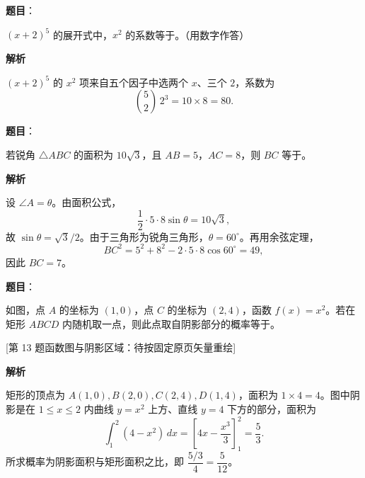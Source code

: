 \begin{answer}

\textbf{题目}：

$(x+2)^5$ 的展开式中，$x^2$ 的系数等于\gkblank{}。（用数字作答）

\textbf{解析}

$(x+2)^5$ 的 $x^2$ 项来自五个因子中选两个 $x$、三个 $2$，系数为
\nopagebreak[4]
\[
\binom52\,2^3=10\times8=80.
\]


\end{answer}
\begin{answer}

\textbf{题目}：

若锐角 $\triangle ABC$ 的面积为 $10\sqrt3$，且 $AB=5$，$AC=8$，则 $BC$ 等于\gkblank{}。

\textbf{解析}

设 $\angle A=\theta$。由面积公式，
\nopagebreak[4]
\[
\frac12\cdot5\cdot8\sin\theta=10\sqrt3,
\]
故 $\sin\theta=\sqrt3/2$。由于三角形为锐角三角形，$\theta=60^\circ$。再用余弦定理，
\nopagebreak[4]
\[
BC^2=5^2+8^2-2\cdot5\cdot8\cos60^\circ=49,
\]
因此 $BC=7$。


\end{answer}
\begin{answer}

\textbf{题目}：

如图，点 $A$ 的坐标为 $(1,0)$，点 $C$ 的坐标为 $(2,4)$，函数 $f(x)=x^2$。若在矩形 $ABCD$ 内随机取一点，则此点取自阴影部分的概率等于\gkblank{}。

[第 13 题函数图与阴影区域：待按固定原页矢量重绘]

\textbf{解析}

矩形的顶点为 $A(1,0),B(2,0),C(2,4),D(1,4)$，面积为 $1\times4=4$。图中阴影是在 $1\leqslant x\leqslant2$ 内曲线 $y=x^2$ 上方、直线 $y=4$ 下方的部分，面积为
\nopagebreak[4]
\[
\int_1^2(4-x^2)\,dx
=\left[4x-\frac{x^3}{3}\right]_1^2
=\frac53.
\]
所求概率为阴影面积与矩形面积之比，即 $\dfrac{5/3}{4}=\dfrac5{12}$。


\end{answer}
